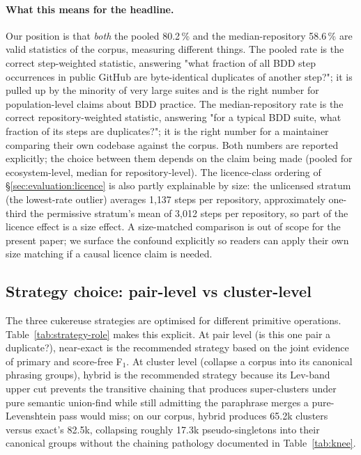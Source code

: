 \documentclass[11pt,a4paper]{article}
\begin{document}
\paragraph{What this means for the headline.} Our position is that
\emph{both} the pooled 80.2\,\% and the median-repository 58.6\,\% are
valid statistics of the corpus, measuring different things. The
pooled rate is the correct step-weighted statistic, answering
"what fraction of all BDD step occurrences in public GitHub are
byte-identical duplicates of another step?"; it is pulled up by the
minority of very large suites and is the right number for
population-level claims about BDD practice. The
median-repository rate is the correct repository-weighted statistic,
answering "for a typical BDD suite, what fraction of its steps are
duplicates?"; it is the right number for a maintainer comparing
their own codebase against the corpus. Both numbers are reported
explicitly; the choice between them depends on the claim being
made (pooled for ecosystem-level, median for repository-level). The licence-class ordering of §\ref{sec:evaluation:licence}
is also partly explainable by size: the unlicensed stratum
(the lowest-rate outlier) averages 1{,}137 steps per repository,
approximately one-third the permissive stratum's mean of 3{,}012
steps per repository, so part of the licence effect is a size effect.
A size-matched comparison is out of scope for the present paper;
we surface the confound explicitly so readers can apply their own
size matching if a causal licence claim is needed.

\subsection{Strategy choice: pair-level vs cluster-level}
\label{sec:evaluation:pair-vs-cluster-role}

The three cukereuse strategies are optimised for different primitive
operations. Table~\ref{tab:strategy-role} makes this explicit. At
pair level (is this one pair a duplicate?), near-exact is the
recommended strategy based on the joint evidence of primary and
score-free F$_1$. At cluster level (collapse a corpus into its
canonical phrasing groups), hybrid is the recommended strategy
because its Lev-band upper cut prevents the transitive chaining
that produces super-clusters under pure semantic union-find while
still admitting the paraphrase merges a pure-Levenshtein pass
would miss; on our corpus, hybrid produces 65.2k clusters versus
exact's 82.5k, collapsing roughly 17.3k pseudo-singletons into
their canonical groups without the chaining pathology
documented in Table~\ref{tab:knee}.
\end{document}
